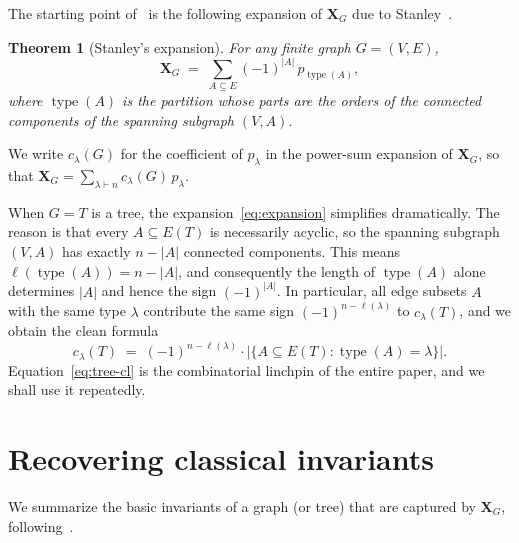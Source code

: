 \documentclass[11pt]{article}
\newtheorem{theorem}{Theorem}[section]
\theoremstyle{definition}
\newcommand{\X}{\mathbf{X}}
\newcommand{\type}{\operatorname{type}}
\begin{document}
The starting point of~\cite{MMW} is the following expansion of $\X_G$
due to Stanley~\cite[Thm.~2.5]{Stanley}.

\begin{theorem}[Stanley's expansion]\label{thm:stanley}
For any finite graph $G=(V,E)$,
\begin{equation}\label{eq:expansion}
   \X_G \;=\; \sum_{A\subseteq E} (-1)^{|A|}\,p_{\type(A)},
\end{equation}
where $\type(A)$ is the partition whose parts are the orders of the
connected components of the spanning subgraph $(V,A)$.
\end{theorem}

We write $c_\lambda(G)$ for the coefficient of $p_\lambda$ in the
power-sum expansion of $\X_G$, so that
$\X_G = \sum_{\lambda\vdash n} c_\lambda(G)\,p_\lambda$.

When $G=T$ is a tree, the expansion~\eqref{eq:expansion} simplifies
dramatically.  The reason is that every $A\subseteq E(T)$ is necessarily
acyclic, so the spanning subgraph $(V,A)$ has exactly $n-|A|$ connected
components.  This means $\ell(\type(A)) = n-|A|$, and consequently the
length of $\type(A)$ alone determines $|A|$ and hence the sign
$(-1)^{|A|}$.  In particular, all edge subsets $A$ with the same type
$\lambda$ contribute the same sign $(-1)^{n-\ell(\lambda)}$ to
$c_\lambda(T)$, and we obtain the clean formula
\begin{equation}\label{eq:tree-cl}
   c_\lambda(T)
   \;=\;(-1)^{n-\ell(\lambda)}
        \cdot \bigl|\{A\subseteq E(T) : \type(A)=\lambda\}\bigr|.
\end{equation}
Equation~\eqref{eq:tree-cl} is the combinatorial linchpin of the entire
paper, and we shall use it repeatedly.

\section{Recovering classical invariants}\label{sec:invariants}

We summarize the basic invariants of a graph (or tree) that are
captured by $\X_G$, following~\cite[Prop.~2 \& Cor.~5]{MMW}.
\end{document}
